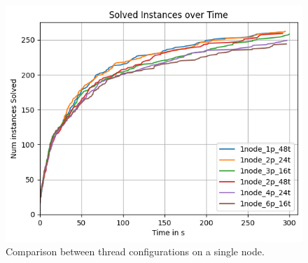 \documentclass[12pt,a4paper,twoside]{scrartcl}
\numberwithin{equation}{section}
\begin{document}
\begin{figure}
  \center
  \includegraphics{plots/config_compare/1node_config_compare.png}
  \caption{Comparison between thread configurations on a single node.}
  \label{fig:1nodeConfigCompare}
\end{figure}
\end{document}
